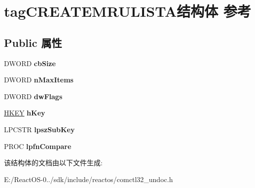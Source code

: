 \hypertarget{structtag_c_r_e_a_t_e_m_r_u_l_i_s_t_a}{}\section{tag\+C\+R\+E\+A\+T\+E\+M\+R\+U\+L\+I\+S\+T\+A结构体 参考}
\label{structtag_c_r_e_a_t_e_m_r_u_l_i_s_t_a}
\subsection*{Public 属性}
\begin{DoxyCompactItemize}
\item 
\mbox{\label{structtag_c_r_e_a_t_e_m_r_u_l_i_s_t_a_a236064a293dd4a543b67f33df40a68eb}} 
D\+W\+O\+RD {\bfseries cb\+Size}
\item 
\mbox{\label{structtag_c_r_e_a_t_e_m_r_u_l_i_s_t_a_a4bc9988d936fa15998c0901df52e356d}} 
D\+W\+O\+RD {\bfseries n\+Max\+Items}
\item 
\mbox{\label{structtag_c_r_e_a_t_e_m_r_u_l_i_s_t_a_a635792501afbd6488ddeace4956e2474}} 
D\+W\+O\+RD {\bfseries dw\+Flags}
\item 
\mbox{\label{structtag_c_r_e_a_t_e_m_r_u_l_i_s_t_a_a1b76dd081643a83f013e740a25fffb3d}} 
\hyperlink{interfacevoid}{H\+K\+EY} {\bfseries h\+Key}
\item 
\mbox{\label{structtag_c_r_e_a_t_e_m_r_u_l_i_s_t_a_afddcc892122d0924e1c831b5444b83ba}} 
L\+P\+C\+S\+TR {\bfseries lpsz\+Sub\+Key}
\item 
\mbox{\label{structtag_c_r_e_a_t_e_m_r_u_l_i_s_t_a_a58b21e3c319aaf76ee84fade1d4c79e6}} 
P\+R\+OC {\bfseries lpfn\+Compare}
\end{DoxyCompactItemize}


该结构体的文档由以下文件生成\+:\begin{DoxyCompactItemize}
\item 
E\+:/\+React\+O\+S-\/0../sdk/include/reactos/comctl32\+\_\+undoc.\+h\end{DoxyCompactItemize}
